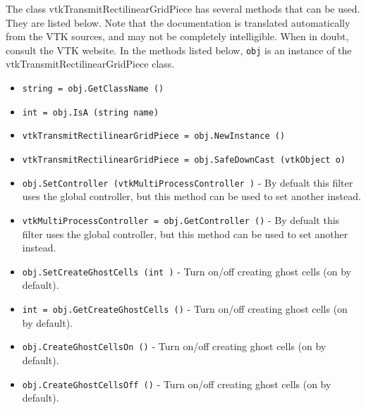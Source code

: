 The class vtkTransmitRectilinearGridPiece has several methods that can be used.
  They are listed below.
Note that the documentation is translated automatically from the VTK sources,
and may not be completely intelligible.  When in doubt, consult the VTK website.
In the methods listed below, \verb|obj| is an instance of the vtkTransmitRectilinearGridPiece class.
\begin{itemize}
\item  \verb|string = obj.GetClassName ()|

\item  \verb|int = obj.IsA (string name)|

\item  \verb|vtkTransmitRectilinearGridPiece = obj.NewInstance ()|

\item  \verb|vtkTransmitRectilinearGridPiece = obj.SafeDownCast (vtkObject o)|

\item  \verb|obj.SetController (vtkMultiProcessController )| -  By defualt this filter uses the global controller,
 but this method can be used to set another instead.

\item  \verb|vtkMultiProcessController = obj.GetController ()| -  By defualt this filter uses the global controller,
 but this method can be used to set another instead.

\item  \verb|obj.SetCreateGhostCells (int )| -  Turn on/off creating ghost cells (on by default).

\item  \verb|int = obj.GetCreateGhostCells ()| -  Turn on/off creating ghost cells (on by default).

\item  \verb|obj.CreateGhostCellsOn ()| -  Turn on/off creating ghost cells (on by default).

\item  \verb|obj.CreateGhostCellsOff ()| -  Turn on/off creating ghost cells (on by default).

\end{itemize}
